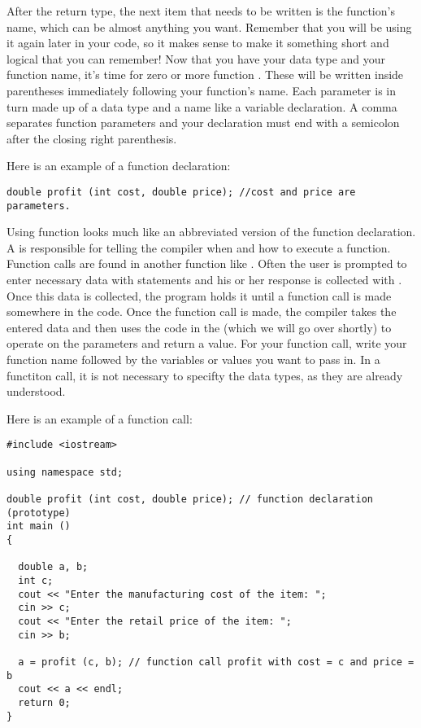 After the return type, the next item that needs to be written is the function's name, which can be almost anything you want. 
Remember that you will be using it again later in your code, so it makes sense to make it something short and logical that you can remember! 
Now that you have your data type and your function name, it's time for zero or more function . 
These will be written inside parentheses immediately following your function's name. 
Each parameter is in turn made up of a data type and a name like a variable declaration. 
A comma separates function parameters and your declaration must end with a semicolon after the closing right parenthesis.

Here is an example of a function declaration:

\begin{lstlisting}
double profit (int cost, double price); //cost and price are parameters.
\end{lstlisting}
        	
Using function looks much like an abbreviated version of the function declaration. 
A  is responsible for telling the compiler when and how to execute a function.
Function calls are found in another function like . 
Often the user is prompted to enter necessary data with  statements and his or her response is collected with . 
Once this data is collected, the program holds it until a function call is made somewhere in the code.
Once the function call is made, the compiler takes the entered data and then uses the code in the  (which we will go over shortly) to operate on the parameters and return a value. 
For your function call, write your function name followed by the variables or values you want to pass in.
In a functiton call, it is not necessary to specifty the data types, as they are already understood.
 
Here is an example of a function call:

\begin{lstlisting}
#include <iostream>
 
using namespace std;
 
double profit (int cost, double price); // function declaration (prototype)
int main ()
{
 
  double a, b;
  int c;
  cout << "Enter the manufacturing cost of the item: ";
  cin >> c;
  cout << "Enter the retail price of the item: ";
  cin >> b;
 
  a = profit (c, b); // function call profit with cost = c and price = b
  cout << a << endl;
  return 0;
}
\end{lstlisting}
  
